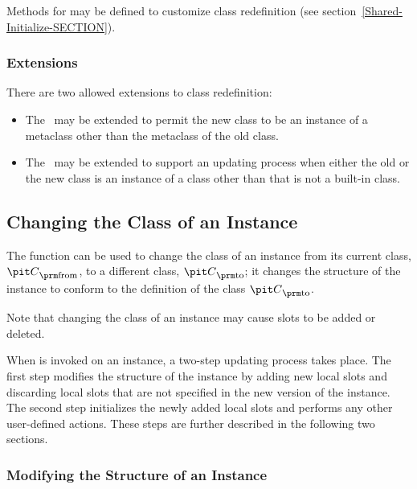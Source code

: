 Methods for  may be defined to customize class
redefinition (see section~\ref{Shared-Initialize-SECTION}).


\subsubsection{Extensions}

There are two allowed extensions to class redefinition: 

\begin{itemize}

\item  The \OS\ may be extended to permit the new class
to be an instance of a metaclass other than the metaclass of the
old class.

\item  The \OS\ may be extended to support an updating process
when either the old or the new class is an instance of a
class other than  that is not a built-in class.

\end{itemize}


\subsection{Changing the Class of an Instance}
\label{Changing-the-Class-of-an-Instance-SECTION}

The function  can be used to change the class of an
instance from its current class, ${\it C}\sub {\hbox{{\footnotesize\rm from}}}$, to a
different class, ${\it C}\sub {\hbox{{\footnotesize\rm to}}}$; it changes the
structure of the instance to conform to the definition of the class
${\it C}\sub {\hbox{{\footnotesize\rm to}}}$.

Note that changing the class of an instance may cause slots to be
added or deleted. 

When  is invoked on an instance, a two-step updating
process takes place.  The first step modifies the structure of
the instance by adding new local slots and discarding local slots that
are not specified in the new version of the instance.  The second step
initializes the newly added local slots and performs any other
user-defined actions. These steps are further described in the
following two sections.

\subsubsection{Modifying the Structure of an Instance}

